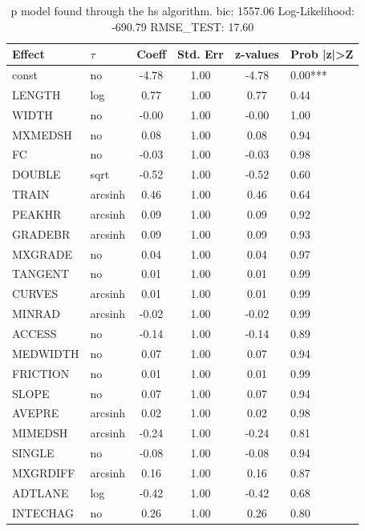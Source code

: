 \begin{table}
	\caption{p model found through the hs algorithm. bic: 1557.06 Log-Likelihood: -690.79 RMSE_TEST: 17.60}
	\begin{center}
		\begin{tabular}{|l|l|c|c|c|l|}
			\hline
			Effect & $\tau$ & Coeff & Std. Err & z-values & Prob |z|>Z \\
			\hline
			const & no & -4.78 & 1.00 & -4.78 & 0.00*** \\
			\hline
			LENGTH & log & 0.77 & 1.00 & 0.77 & 0.44 \\
			\hline
			WIDTH & no & -0.00 & 1.00 & -0.00 & 1.00 \\
			\hline
			MXMEDSH & no & 0.08 & 1.00 & 0.08 & 0.94 \\
			\hline
			FC & no & -0.03 & 1.00 & -0.03 & 0.98 \\
			\hline
			DOUBLE & sqrt & -0.52 & 1.00 & -0.52 & 0.60 \\
			\hline
			TRAIN & arcsinh & 0.46 & 1.00 & 0.46 & 0.64 \\
			\hline
			PEAKHR & arcsinh & 0.09 & 1.00 & 0.09 & 0.92 \\
			\hline
			GRADEBR & arcsinh & 0.09 & 1.00 & 0.09 & 0.93 \\
			\hline
			MXGRADE & no & 0.04 & 1.00 & 0.04 & 0.97 \\
			\hline
			TANGENT & no & 0.01 & 1.00 & 0.01 & 0.99 \\
			\hline
			CURVES & arcsinh & 0.01 & 1.00 & 0.01 & 0.99 \\
			\hline
			MINRAD & arcsinh & -0.02 & 1.00 & -0.02 & 0.99 \\
			\hline
			ACCESS & no & -0.14 & 1.00 & -0.14 & 0.89 \\
			\hline
			MEDWIDTH & no & 0.07 & 1.00 & 0.07 & 0.94 \\
			\hline
			FRICTION & no & 0.01 & 1.00 & 0.01 & 0.99 \\
			\hline
			SLOPE & no & 0.07 & 1.00 & 0.07 & 0.94 \\
			\hline
			AVEPRE & arcsinh & 0.02 & 1.00 & 0.02 & 0.98 \\
			\hline
			MIMEDSH & arcsinh & -0.24 & 1.00 & -0.24 & 0.81 \\
			\hline
			SINGLE & no & -0.08 & 1.00 & -0.08 & 0.94 \\
			\hline
			MXGRDIFF & arcsinh & 0.16 & 1.00 & 0.16 & 0.87 \\
			\hline
			ADTLANE & log & -0.42 & 1.00 & -0.42 & 0.68 \\
			\hline
			INTECHAG & no & 0.26 & 1.00 & 0.26 & 0.80 \\

\end{tabular}
\end{center}
\end{table}
